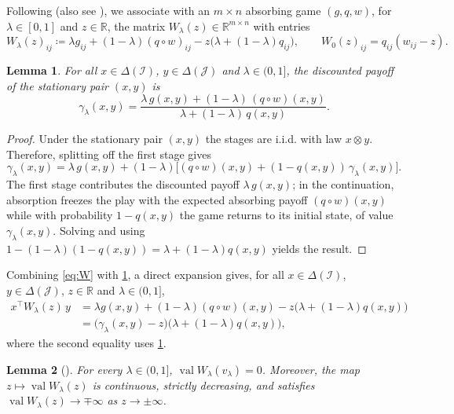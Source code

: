 \documentclass[11pt, a4paper]{article}
\theoremstyle{plain}
\newtheorem{lemma}{Lemma}
\theoremstyle{definition}
\newcommand{\R}{\mathbb{R}}
\DeclareMathOperator{\val}{val}
\newcommand{\defas}{\coloneqq}
\newcommand{\I}{\mathcal{I}}
\newcommand{\J}{\mathcal{J}}
\begin{document}
Following \citet[Definition~1]{OV23} (also see \citealp{AO19}), we associate with an $m\times n$ absorbing game $(g,q,w)$, for $\lambda\in[0,1]$ and $z\in\R$, the matrix $W_\lambda(z)\in\R^{m\times n}$ with entries
\begin{equation}\label{eq:W}
W_\lambda(z)_{ij}\defas \lambda g_{ij}+(1-\lambda)(q\circ w)_{ij}-z\bigl(\lambda+(1-\lambda)q_{ij}\bigr),
\qquad
W_0(z)_{ij}=q_{ij}(w_{ij}-z).
\end{equation}

\begin{lemma}\label{lem:gamma}
For all $x\in\Delta(\I)$, $y\in\Delta(\J)$ and $\lambda\in(0,1]$, the discounted payoff of the stationary pair $(x,y)$ is
\[
\gamma_\lambda(x,y)=\frac{\lambda\,g(x,y)+(1-\lambda)\,(q\circ w)(x,y)}{\lambda+(1-\lambda)\,q(x,y)} .
\]
\end{lemma}

\begin{proof}
Under the stationary pair $(x,y)$ the stages are i.i.d. with law $x \otimes y$. Therefore, splitting off the first stage gives
\[
\gamma_\lambda(x,y)=\lambda\,g(x,y)+(1-\lambda)\bigl[(q\circ w)(x,y)+(1-q(x,y))\,\gamma_\lambda(x,y)\bigr].
\]
The first stage contributes the discounted payoff $\lambda\,g(x,y)$; in the continuation, absorption freezes the play with the expected absorbing payoff $(q\circ w)(x,y)$ while with probability $1-q(x,y)$ the game returns to its initial state, of value $\gamma_\lambda(x,y)$. Solving and using $1-(1-\lambda)(1-q(x,y))=\lambda+(1-\lambda)q(x,y)$ yields the result.
\end{proof}

Combining \cref{eq:W} with \cref{lem:gamma}, a direct expansion gives, for all $x\in\Delta(\I)$, $y\in\Delta(\J)$, $z\in\R$ and $\lambda\in(0,1]$,
\begin{align}
x^{\top}W_\lambda(z)\,y &=\lambda g(x,y)+(1-\lambda)(q\circ w)(x,y)-z\bigl(\lambda+(1-\lambda)q(x,y)\bigr) \nonumber\\
&=\bigl(\gamma_\lambda(x,y)-z\bigr)\bigl(\lambda+(1-\lambda)q(x,y)\bigr),
    \label{eq:bilinear}
\end{align}
where the second equality uses \cref{lem:gamma}.

\begin{lemma}[{\citealp[Theorem~1]{AO19}}]\label{lem:shapleypencil}
For every $\lambda\in(0,1]$, $\val W_\lambda(v_\lambda)=0$. Moreover, the map $z\mapsto\val W_\lambda(z)$ is continuous, strictly decreasing, and satisfies $\val W_\lambda(z)\to\mp\infty$ as $z\to\pm\infty$.
\end{lemma}
\end{document}
